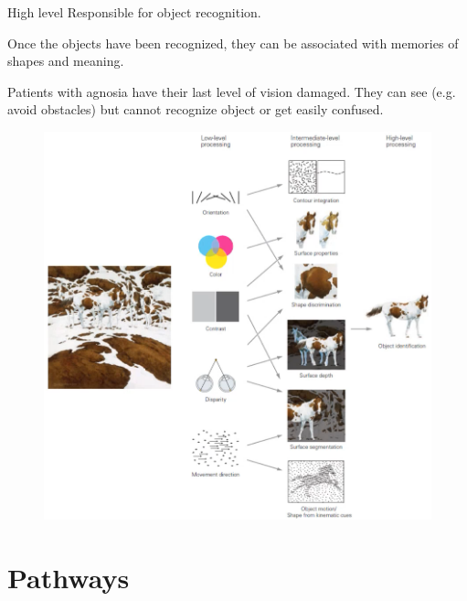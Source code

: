 \begin{description}
\begin{descriptionlist}
            \item[High level] 
                Responsible for object recognition.
                
                Once the objects have been recognized, they can be associated with memories of shapes and meaning.

                \begin{casestudy}[Agnosia]
                    Patients with agnosia have their last level of vision damaged.
                    They can see (e.g. avoid obstacles) but cannot recognize object or get easily confused.
                \end{casestudy}
        \end{descriptionlist}

        \begin{figure}[H]
            \centering
            \includegraphics[width=0.6\linewidth]{./img/vision_levels.png}
        \end{figure}
\end{description}



\section{Pathways}

